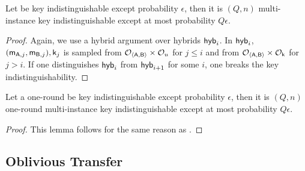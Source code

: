 \begin{lemma}\label{lem:keytomultkey}
Let \UKA be key indistinguishable except probability $\epsilon$, then it is $(Q,n)$ multi-instance key indistinguishable except at most probability $Q\epsilon$. 
\end{lemma}

\begin{proof}
Again, we use a hybrid argument over hybrids $\mathsf{hyb}_i$. In $\mathsf{hyb}_i$, $(\mathsf{m}_{\mathsf{A},j},\mathsf{m}_{\mathsf{B},j}),\mathsf{k}_j$ is sampled from $\mathcal{O}_{\langle \mathsf{A},\mathsf{B}\rangle}\times\mathcal{O}_u$ for $j\leq i$ and from $\mathcal{O}_{\langle \mathsf{A},\mathsf{B}\rangle}\times\mathcal{O}_\mathsf{k}$ for $j>i$. If one distinguishes $\mathsf{hyb}_i$ from $\mathsf{hyb}_{i+1}$ for some $i$, one breaks the key indistinguishability. 
\end{proof}

\begin{lemma}\label{lem:oneroundkeytomultkey}
Let a one-round \UKA be key indistinguishable except probability $\epsilon$, then it is $(Q,n)$ one-round multi-instance key indistinguishable except at most probability $Q\epsilon$. 
\end{lemma}

\begin{proof}
This lemma follows for the same reason as .
\end{proof}

\subsection{Oblivious Transfer}



